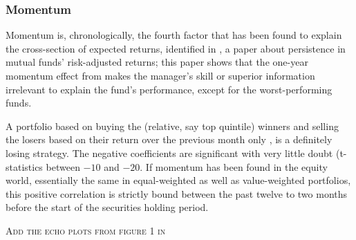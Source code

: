 \subsubsection{Momentum}
Momentum is, chronologically, the fourth factor that has been found to explain the cross-section of expected returns, identified in \cite{Carhart1997}, a paper about persistence in mutual funds' risk-adjusted returns; this paper shows that the one-year momentum effect from \cite{Jegadeesh1993} makes the manager's skill or superior information irrelevant to explain the fund's performance, except for the worst-performing funds.

A portfolio based on buying the (relative, say top quintile) winners and selling the losers based on their return over the previous month only \parencite{Novy-Marx2012}, is a definitely losing strategy. The negative coefficients are significant with very little doubt (t-statistics between $-10$ and $-20$. If momentum has been found in the equity world, essentially the same in equal-weighted as well as value-weighted portfolios, this positive correlation is strictly bound between the past twelve to two months before the start of the securities holding period.

\begin{center}
\textsc{Add the echo plots from figure 1 in \cite{Novy-Marx2012}}
\end{center}

